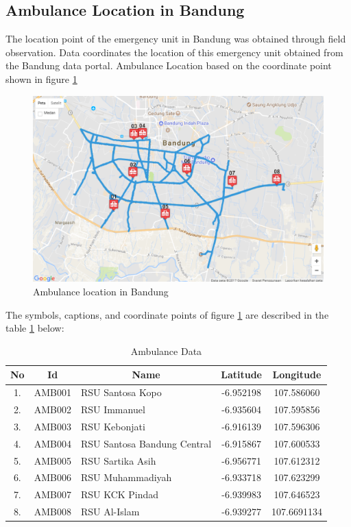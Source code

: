 \subsection{Ambulance Location in Bandung}
The location point of the emergency unit in Bandung was obtained through field observation. Data coordinates the location of this emergency unit obtained from the Bandung data portal. Ambulance Location based on the coordinate point shown in figure \ref{fig:ambulance_location}
\begin{figure}[H]
    \centering
    \includegraphics[scale=0.6]{data_coll2.png}
    \caption{Ambulance location in Bandung}
    \label{fig:ambulance_location}
\end{figure}

The symbols, captions, and coordinate points of figure \ref{fig:ambulance_location} are described in the table \ref{table:ambulance_data} below:

\begin{table}[H] 
\centering
\begin{tabular}{|c|c|c|c|c|}
\hline
\rowcolor{gray}
\textbf{No} & \textbf{Id} & \textbf{Name} & \textbf{Latitude} & \textbf{Longitude} \\
\hline
1. & AMB001 & \multicolumn{1}{|l|}{RSU Santosa Kopo} & -6.952198 & 107.586060 \\
\cline{1-5}
2. & AMB002 & \multicolumn{1}{|l|}{RSU Immanuel} & -6.935604 & 107.595856 \\
\cline{1-5}
3. & AMB003 & \multicolumn{1}{|l|}{RSU Kebonjati} & -6.916139 & 107.596306 \\
\cline{1-5}
4. & AMB004 & \multicolumn{1}{|l|}{RSU Santosa Bandung Central} & -6.915867 & 107.600533 \\
\cline{1-5}
5. & AMB005 & \multicolumn{1}{|l|}{RSU Sartika Asih} & -6.956771 & 107.612312 \\
\cline{1-5}
6. & AMB006 & \multicolumn{1}{|l|}{RSU Muhammadiyah} & -6.933718 & 107.623299 \\
\cline{1-5}
7. & AMB007 & \multicolumn{1}{|l|}{RSU KCK Pindad} & -6.939983 & 107.646523  \\
\cline{1-5}
8. & AMB008 & \multicolumn{1}{|l|}{RSU Al-Islam} & -6.939277 & 107.6691134 \\
\hline
\end{tabular}
\caption{Ambulance Data}
\label{table:ambulance_data}
\end{table}

